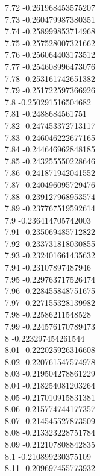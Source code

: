 {7.72	-0.261968453575207\\
7.73	-0.260479987380351\\
7.74	-0.258999853714968\\
7.75	-0.257528007321662\\
7.76	-0.256064403173512\\
7.77	-0.254608996473076\\
7.78	-0.253161742651382\\
7.79	-0.251722597366926\\
7.8	-0.250291516504682\\
7.81	-0.2488684561751\\
7.82	-0.247453372713117\\
7.83	-0.246046222677165\\
7.84	-0.244646962848185\\
7.85	-0.243255550228646\\
7.86	-0.241871942041552\\
7.87	-0.240496095729476\\
7.88	-0.239127968953574\\
7.89	-0.237767519592614\\
7.9	-0.236414705742003\\
7.91	-0.235069485712822\\
7.92	-0.233731818030855\\
7.93	-0.232401661435632\\
7.94	-0.23107897487946\\
7.95	-0.229763717526474\\
7.96	-0.228455848751675\\
7.97	-0.227155328139982\\
7.98	-0.22586211548528\\
7.99	-0.224576170789473\\
8	-0.223297454261544\\
8.01	-0.222025926316608\\
8.02	-0.220761547574978\\
8.03	-0.219504278861229\\
8.04	-0.218254081203264\\
8.05	-0.217010915831381\\
8.06	-0.215774744177357\\
8.07	-0.214545527873509\\
8.08	-0.213323228751784\\
8.09	-0.212107808842835\\
8.1	-0.210899230375109\\
8.11	-0.209697455773932\\
}
